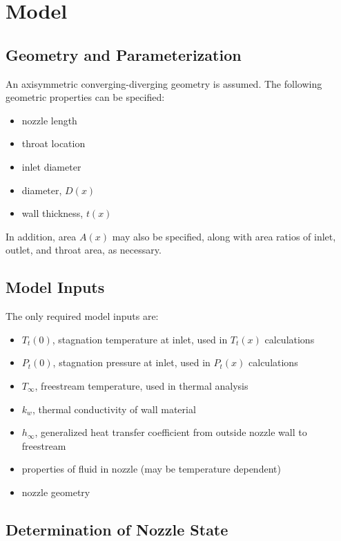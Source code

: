\documentclass{article}
\begin{document}
\section{Model}

\subsection{Geometry and Parameterization}

An axisymmetric converging-diverging geometry is assumed. The following geometric properties can be specified:

\begin{itemize}
\item nozzle length
\item throat location
\item inlet diameter
\item diameter, $D(x)$
\item wall thickness, $t(x)$
\end{itemize}

In addition, area $A(x)$ may also be specified, along with area ratios of inlet, outlet, and throat area, as necessary.

\subsection{Model Inputs}

The only required model inputs are:

\begin{itemize}
\item $T_t(0)$, stagnation temperature at inlet, used in $T_t(x)$ calculations
\item $P_t(0)$, stagnation pressure at inlet, used in $P_t(x)$ calculations
\item $T_{\infty}$, freestream temperature, used in thermal analysis
\item $k_w$, thermal conductivity of wall material
\item $h_{\infty}$, generalized heat transfer coefficient from outside nozzle wall to freestream
\item properties of fluid in nozzle (may be temperature dependent)
\item nozzle geometry
\end{itemize}

\subsection{Determination of Nozzle State}
\end{document}
